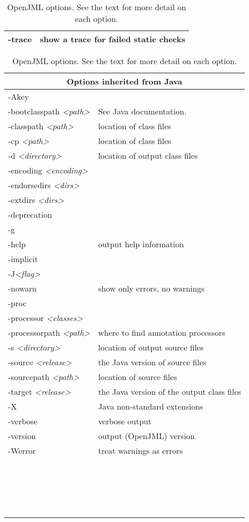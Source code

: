 \documentclass{report}%
\begin{document}
\begin{table}
{\begin{tabular}{|l|p{1.2in}|}
-trace & show a trace for failed static checks\\
\hline
\end{tabular}
}
\qquad
\parbox{.5\textwidth}{
\begin{tabular}{|l|p{1.2in}|}
\hline
\multicolumn{2}{|c|}{Options inherited from Java} \\
\hline
-Akey & \\
-bootclasspath {\it <path>}& See Java documentation. \\
-classpath {\it <path>}& location of class files \\
-cp {\it <path>}& location of class files\\
-d {\it <directory>} & location of output class files\\
-encoding {\it <encoding>} & \\
-endorsedirs {\it <dirs>} & \\
-extdirs {\it <dirs>} & \\
-deprecation & \\
-g & \\
-help & output help information\\
-implicit & \\
-J{\it <flag>} & \\
-nowarn & show only errors, no warnings \\
-proc & \\
-processor {\it <classes>} & \\
-processorpath {\it <path>} & where to find annotation processors\\
-s {\it <directory>} & location of output source files\\
-source {\it <release>} & the Java version of source files\\
-sourcepath {\it <path>} & location of source files\\
-target {\it <release>} & the Java version of the output class files\\
-X & Java non-standard extensions\\
-verbose & verbose output \\
-version & output (OpenJML) version\\
-Werror & treat warnings as errors \\
 \ & \\
\ & \\
\ & \\
\ & \\
\hline
\end{tabular}
}
\caption{OpenJML options. See the text for more detail on each option.}
\label{Tab:Options}
\end{table}
\end{document}
